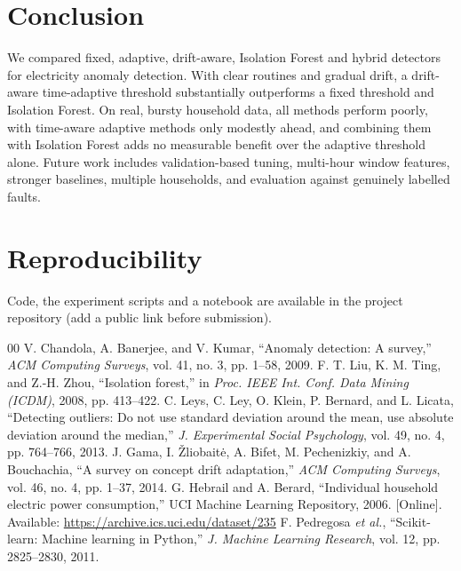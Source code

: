 \documentclass[conference]{IEEEtran}
\begin{document}
\section{Conclusion}
We compared fixed, adaptive, drift-aware, Isolation Forest and hybrid detectors for electricity anomaly detection. With clear routines and gradual drift, a drift-aware time-adaptive threshold substantially outperforms a fixed threshold and Isolation Forest. On real, bursty household data, all methods perform poorly, with time-aware adaptive methods only modestly ahead, and combining them with Isolation Forest adds no measurable benefit over the adaptive threshold alone. Future work includes validation-based tuning, multi-hour window features, stronger baselines, multiple households, and evaluation against genuinely labelled faults.

\section*{Reproducibility}
Code, the experiment scripts and a notebook are available in the project repository (add a public link before submission).

\begin{thebibliography}{00}
 V. Chandola, A. Banerjee, and V. Kumar, ``Anomaly detection: A survey,'' \emph{ACM Computing Surveys}, vol. 41, no. 3, pp. 1--58, 2009.
 F. T. Liu, K. M. Ting, and Z.-H. Zhou, ``Isolation forest,'' in \emph{Proc. IEEE Int. Conf. Data Mining (ICDM)}, 2008, pp. 413--422.
 C. Leys, C. Ley, O. Klein, P. Bernard, and L. Licata, ``Detecting outliers: Do not use standard deviation around the mean, use absolute deviation around the median,'' \emph{J. Experimental Social Psychology}, vol. 49, no. 4, pp. 764--766, 2013.
 J. Gama, I. \v{Z}liobait\.{e}, A. Bifet, M. Pechenizkiy, and A. Bouchachia, ``A survey on concept drift adaptation,'' \emph{ACM Computing Surveys}, vol. 46, no. 4, pp. 1--37, 2014.
 G. Hebrail and A. Berard, ``Individual household electric power consumption,'' UCI Machine Learning Repository, 2006. [Online]. Available: \url{https://archive.ics.uci.edu/dataset/235}
 F. Pedregosa \emph{et al.}, ``Scikit-learn: Machine learning in Python,'' \emph{J. Machine Learning Research}, vol. 12, pp. 2825--2830, 2011.
\end{thebibliography}
\end{document}
